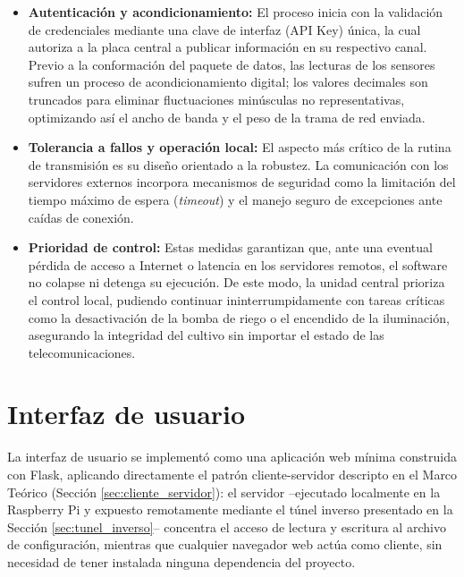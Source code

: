 \begin{itemize}
    \item \textbf{Autenticación y acondicionamiento:} El proceso inicia con la validación de credenciales mediante una clave de interfaz (API Key) única, la cual autoriza a la placa central a publicar información en su respectivo canal. Previo a la conformación del paquete de datos, las lecturas de los sensores sufren un proceso de acondicionamiento digital; los valores decimales son truncados para eliminar fluctuaciones minúsculas no representativas, optimizando así el ancho de banda y el peso de la trama de red enviada.
    \item \textbf{Tolerancia a fallos y operación local:} El aspecto más crítico de la rutina de transmisión es su diseño orientado a la robustez. La comunicación con los servidores externos incorpora mecanismos de seguridad como la limitación del tiempo máximo de espera (\textit{timeout}) y el manejo seguro de excepciones ante caídas de conexión.
    \item \textbf{Prioridad de control:} Estas medidas garantizan que, ante una eventual pérdida de acceso a Internet o latencia en los servidores remotos, el software no colapse ni detenga su ejecución. De este modo, la unidad central prioriza el control local, pudiendo continuar ininterrumpidamente con tareas críticas como la desactivación de la bomba de riego o el encendido de la iluminación, asegurando la integridad del cultivo sin importar el estado de las telecomunicaciones.
\end{itemize}


\section{Interfaz de usuario}
\label{sec:interfaz_usuario}

La interfaz de usuario se implementó como una aplicación web mínima construida con Flask, aplicando directamente el patrón cliente-servidor descripto en el Marco Teórico (Sección \ref{sec:cliente_servidor}): el servidor --ejecutado localmente en la Raspberry Pi y expuesto remotamente mediante el túnel inverso presentado en la Sección \ref{sec:tunel_inverso}-- concentra el acceso de lectura y escritura al archivo de configuración, mientras que cualquier navegador web actúa como cliente, sin necesidad de tener instalada ninguna dependencia del proyecto.

